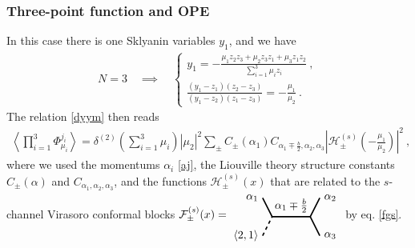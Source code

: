 \documentclass[12pt, a4paper, notitlepage, twoside]{report}
\numberwithin{equation}{section}
\theoremstyle{break}
\begin{document}
\subsubsection{Three-point function and OPE}

In this case there is one Sklyanin variables $y_1$, and we have
\begin{align}
 N=3 \quad \implies \quad  \left\{\begin{array}{l} y_1 = -\frac{\mu_1z_2z_3+\mu_2z_3z_1+\mu_3z_1z_2}{\sum_{i=1}^3\mu_iz_i}\ , \\ \frac{(y_1-z_1)(z_2-z_3)}{(y_1-z_2)(z_1-z_3)} = -\frac{\mu_1}{\mu_2}\ . \end{array}\right.
\end{align}
The relation \eqref{dyym} then reads 
\begin{align}
 \left\langle \prod_{i=1}^3\Phi^{j_i}_{\mu_i} \right\rangle = \delta^{(2)}(\textstyle{\sum}_{i=1}^3\mu_i) |\mu_2|^2 \sum_\pm C_\pm(\alpha_1)C_{\alpha_1\mp\frac{b}{2},\alpha_2,\alpha_3} \left|\mathcal{H}^{(s)}_\pm(-\tfrac{\mu_1}{\mu_2})  \right|^2\ , 
\label{sfpm}
\end{align}
where we used the momentums $\alpha_i$ \eqref{aj}, the Liouville theory structure constants $C_\pm(\alpha)$ and $C_{\alpha_1,\alpha_2,\alpha_3}$, and the functions $\mathcal{H}^{(s)}_\pm(x)$ that are related to the 
$s$-channel Virasoro conformal blocks  
$
 \mathcal{F}^{(s)}_\pm(x)  =  
\begin{tikzpicture}[baseline=(current  bounding  box.center), very thick, scale = .3]
\draw (-1,2) node [left] {$\alpha_1$} -- (0,0) -- node [above] {$\alpha_1\mp \frac{b}{2}$} (4,0) -- (5,2) node [right] {$\alpha_2$};
\draw[dashed] (-1,-2) node [left] {$\langle 2,1 \rangle$} -- (0,0);
\draw (4,0) -- (5,-2) node [right] {$\alpha_3$};
\end{tikzpicture}
$
by eq. \eqref{fgs}. 
\end{document}
